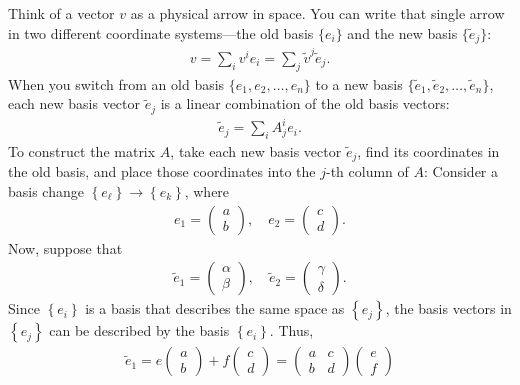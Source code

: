 \documentclass{report}
\begin{document}
\begin{itemize}
            Think of a vector \(v\) as a physical arrow in space. You can write that single arrow in two different coordinate systems—the old basis \(\{e_i\}\) and the new basis \(\{\tilde{e}_j\}\):
            \begin{align*}
                v=\sum _{i}v^{i}e_{i}=\sum _{j}\tilde{v}^{j}\tilde{e}_{j}
            .\end{align*}
            When you switch from an old basis \(\{e_1, e_2, \dots, e_n\}\) to a new basis \(\{\tilde{e}_1, \tilde{e}_2, \dots, \tilde{e}_n\}\), each new basis vector \(\tilde{e}_{j}\) is a linear combination of the old basis vectors:
            \begin{align*}
                \tilde{e}_{j} = \sum_{i}A_{j}^{i}e_{i}
            .\end{align*}
            To construct the matrix \(A\), take each new basis vector \(\tilde{e}_{j}\), find its coordinates in the old basis, and place those coordinates into the \(j\)-th column of \(A\):
            \bigbreak \noindent 
            Consider a basis change $\left\{e_{\mathbf{\ell}}\right\} \to \left\{e_{k}\right\}$, where 
            \begin{align*}
                e_{1} = \begin{pmatrix} a \\ b \end{pmatrix}, \quad e_{2} = \begin{pmatrix} c \\ d \end{pmatrix}
            .\end{align*}
            Now, suppose that
            \begin{align*}
                \tilde{e}_{1} = \begin{pmatrix} \alpha \\ \beta \end{pmatrix}, \quad \tilde{e}_{2} = \begin{pmatrix} \gamma \\ \delta \end{pmatrix}
            .\end{align*}
            Since $\left\{e_{i}\right\}$ is a basis that describes the same space as $\left\{e_{j}\right\}$, the basis vectors in $\left\{e_{j}\right\}$ can be described by the basis $\left\{e_{i}\right\}$. Thus, 
            \begin{align*}
                \tilde{e}_{1} = e \begin{pmatrix} a \\b \end{pmatrix} + f \begin{pmatrix} c \\ d \end{pmatrix} = \begin{pmatrix} a & c \\ b & d \end{pmatrix} \begin{pmatrix} e \\ f \end{pmatrix}

\end{align*}
\end{itemize}
\end{document}
